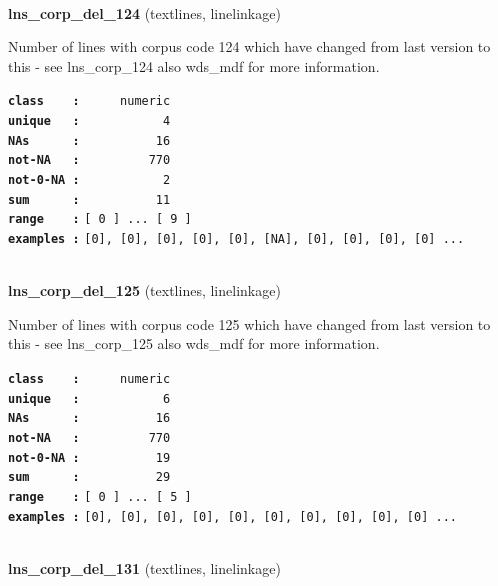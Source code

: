 \documentclass[]{article}
\begin{document}
~

\textbf{lns\_corp\_del\_124} (textlines, linelinkage)

Number of lines with corpus code 124 which have changed from last
version to this - see lns\_corp\_124 also wds\_mdf for more information.

\textbf{\texttt{class\ \ \ \ :}} \texttt{~~~~~numeric}\\
\textbf{\texttt{unique\ \ \ :}} \texttt{~~~~~~~~~~~4}\\
\textbf{\texttt{NAs\ \ \ \ \ \ :}} \texttt{~~~~~~~~~~16}\\
\textbf{\texttt{not-NA\ \ \ :}} \texttt{~~~~~~~~~770}\\
\textbf{\texttt{not-0-NA\ :}} \texttt{~~~~~~~~~~~2}\\
\textbf{\texttt{sum\ \ \ \ \ \ :}} \texttt{~~~~~~~~~~11}\\
\textbf{\texttt{range\ \ \ \ :}}
\texttt{{[}\ 0\ {]}\ ...\ {[}\ 9\ {]}}\\
\textbf{\texttt{examples\ :}}
\texttt{{[}0{]},\ {[}0{]},\ {[}0{]},\ {[}0{]},\ {[}0{]},\ {[}NA{]},\ {[}0{]},\ {[}0{]},\ {[}0{]},\ {[}0{]}\ ...}\\

~

\textbf{lns\_corp\_del\_125} (textlines, linelinkage)

Number of lines with corpus code 125 which have changed from last
version to this - see lns\_corp\_125 also wds\_mdf for more information.

\textbf{\texttt{class\ \ \ \ :}} \texttt{~~~~~numeric}\\
\textbf{\texttt{unique\ \ \ :}} \texttt{~~~~~~~~~~~6}\\
\textbf{\texttt{NAs\ \ \ \ \ \ :}} \texttt{~~~~~~~~~~16}\\
\textbf{\texttt{not-NA\ \ \ :}} \texttt{~~~~~~~~~770}\\
\textbf{\texttt{not-0-NA\ :}} \texttt{~~~~~~~~~~19}\\
\textbf{\texttt{sum\ \ \ \ \ \ :}} \texttt{~~~~~~~~~~29}\\
\textbf{\texttt{range\ \ \ \ :}}
\texttt{{[}\ 0\ {]}\ ...\ {[}\ 5\ {]}}\\
\textbf{\texttt{examples\ :}}
\texttt{{[}0{]},\ {[}0{]},\ {[}0{]},\ {[}0{]},\ {[}0{]},\ {[}0{]},\ {[}0{]},\ {[}0{]},\ {[}0{]},\ {[}0{]}\ ...}\\

~

\textbf{lns\_corp\_del\_131} (textlines, linelinkage)
\end{document}
